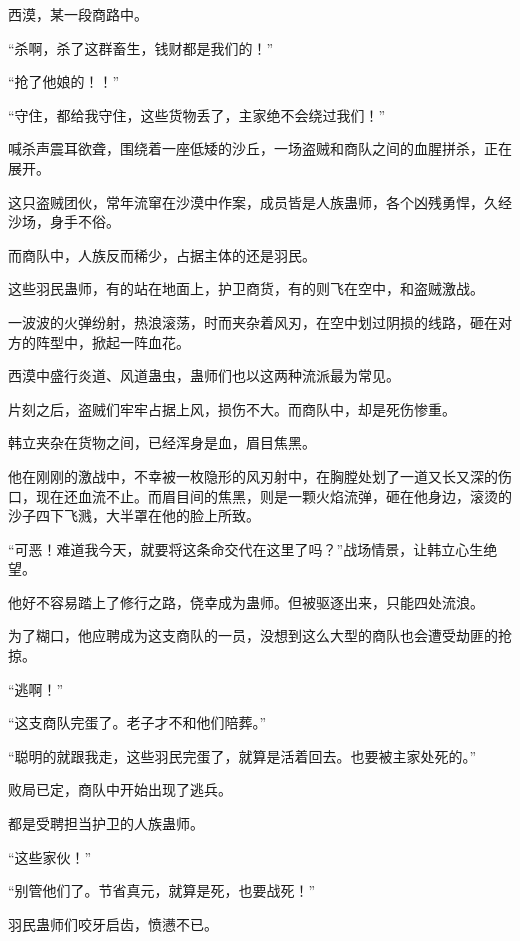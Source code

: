 
\begin{this_body}



西漠，某一段商路中。

“杀啊，杀了这群畜生，钱财都是我们的！”

“抢了他娘的！！”

“守住，都给我守住，这些货物丢了，主家绝不会绕过我们！”

喊杀声震耳欲聋，围绕着一座低矮的沙丘，一场盗贼和商队之间的血腥拼杀，正在展开。

这只盗贼团伙，常年流窜在沙漠中作案，成员皆是人族蛊师，各个凶残勇悍，久经沙场，身手不俗。

而商队中，人族反而稀少，占据主体的还是羽民。

这些羽民蛊师，有的站在地面上，护卫商货，有的则飞在空中，和盗贼激战。

一波波的火弹纷射，热浪滚荡，时而夹杂着风刃，在空中划过阴损的线路，砸在对方的阵型中，掀起一阵血花。

西漠中盛行炎道、风道蛊虫，蛊师们也以这两种流派最为常见。

片刻之后，盗贼们牢牢占据上风，损伤不大。而商队中，却是死伤惨重。

韩立夹杂在货物之间，已经浑身是血，眉目焦黑。

他在刚刚的激战中，不幸被一枚隐形的风刃射中，在胸膛处划了一道又长又深的伤口，现在还血流不止。而眉目间的焦黑，则是一颗火焰流弹，砸在他身边，滚烫的沙子四下飞溅，大半罩在他的脸上所致。

“可恶！难道我今天，就要将这条命交代在这里了吗？”战场情景，让韩立心生绝望。

他好不容易踏上了修行之路，侥幸成为蛊师。但被驱逐出来，只能四处流浪。

为了糊口，他应聘成为这支商队的一员，没想到这么大型的商队也会遭受劫匪的抢掠。

“逃啊！”

“这支商队完蛋了。老子才不和他们陪葬。”

“聪明的就跟我走，这些羽民完蛋了，就算是活着回去。也要被主家处死的。”

败局已定，商队中开始出现了逃兵。

都是受聘担当护卫的人族蛊师。

“这些家伙！”

“别管他们了。节省真元，就算是死，也要战死！”

羽民蛊师们咬牙启齿，愤懑不已。


\end{this_body}
